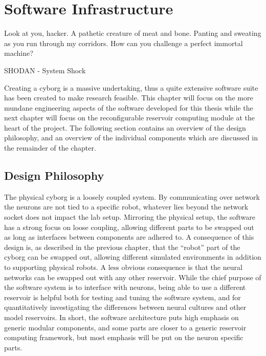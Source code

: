 \chapter{Software Infrastructure}
\epigraph{Look at you, hacker. A pathetic creature of meat and bone. Panting and
sweating as you run through my corridors. How can you challenge a perfect
immortal machine?}
{SHODAN - System Shock}
Creating a cyborg is a massive undertaking, thus a quite extensive software
suite has been created to make research feasible.
This chapter will focus on the more mundane engineering aspects of the software
developed for this thesis while the next chapter will focus on the
reconfigurable reservoir computing module at the heart of the project.
The following section contains an overview of the design philosophy, and an
overview of the individual components which are discussed in the remainder of
the chapter.
\section{Design Philosophy}
%
The physical cyborg is a loosely coupled system.
By communicating over network the neurons are not tied to a specific robot,
whatever lies beyond the network socket does not impact the lab setup.
%
Mirroring the physical setup, the software has a strong focus on loose coupling,
allowing different parts to be swapped out as long as interfaces between
components are adhered to.
%
A consequence of this design is, as described in the previous chapter, that the
``robot'' part of the cyborg can be swapped out, allowing different simulated
environments in addition to supporting physical robots.
A less obvious consequence is that the neural networks can be swapped out with
any other reservoir.
While the chief purpose of the software system is to interface with neurons,
being able to use a different reservoir is helpful both for testing and tuning
the software system, and for quantitatively investigating the differences between
neural cultures and other model reservoirs.
%
In short, the software architecture puts high emphasis on generic modular
components, and some parts are closer to a generic reservoir computing
framework, but most emphasis will be put on the neuron specific parts.
